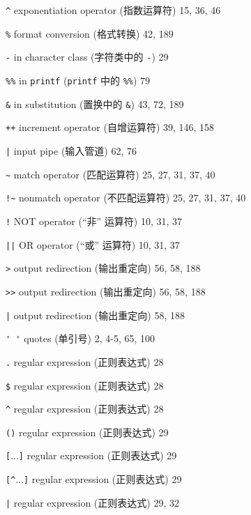 \begin{multicols}{2}
\hangindent=2pc  \verb'^' exponentiation operator (指数运算符) 15, 36, 46

\hangindent=2pc  \verb'%' format conversion (格式转换) 42, 189

\hangindent=2pc  \verb'-' in character class (字符类中的
\verb'-') 29

\hangindent=2pc  \verb'%%' in \verb'printf' (\verb'printf' 中的
\verb'%%') 79

\hangindent=2pc  \verb'&' in substitution (置换中的
\verb'&') 43, 72, 189

\hangindent=2pc  \verb'++' increment operator (自增运算符) 39, 146, 158

\hangindent=2pc  \verb'|' input pipe (输入管道) 62, 76

\hangindent=2pc  \verb'~' match operator (匹配运算符) 25, 27, 31, 37, 40

\hangindent=2pc  \verb'!~' nonmatch operator (不匹配运算符) 25, 27, 31, 37, 40

\hangindent=2pc  \verb'!' NOT operator (``非'' 运算符) 10, 31, 37

\hangindent=2pc  \verb'||' OR operator (``或'' 运算符) 10, 31, 37

\hangindent=2pc  \verb'>' output redirection (输出重定向) 56, 58, 188

\hangindent=2pc  \verb'>>' output redirection (输出重定向) 56, 58, 188

\hangindent=2pc  \verb'|' output redirection (输出重定向) 58, 188

\hangindent=2pc  \verb"' '" quotes (单引号) 2, 4-5, 65, 100

\hangindent=2pc  \verb'.' regular expression (正则表达式) 28

\hangindent=2pc  \verb'$' regular expression (正则表达式) 28

\hangindent=2pc  \verb'^' regular expression (正则表达式) 28

\hangindent=2pc  \verb'()' regular expression (正则表达式) 29

\hangindent=2pc  \verb'['...\verb']' regular expression
(正则表达式) 29

\hangindent=2pc  \verb'[^'...\verb']' regular expression
(正则表达式) 29

\hangindent=2pc  \verb'|' regular expression (正则表达式) 29, 32


\end{multicols}
